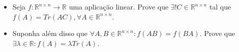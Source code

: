 \begin{itemize}
\item[(a)] Seja \(f\colon  \mathbb{R}^{n\times n}\to\mathbb{R}\) uma aplicação linear. Prove que \(\exists ! C\in\mathbb{R}^{n\times n}\) tal que \(f(A)=Tr(AC), \forall A \in \mathbb{R}^{n\times n}\).

\item[(b)] Suponha além disso que \(\forall A,B \in \mathbb{R}^{n\times n}: f(AB)=f(BA)\). Prove que \(\exists \lambda \in \mathbb{R}: f(A)=\lambda Tr(A)\).
\end{itemize}
